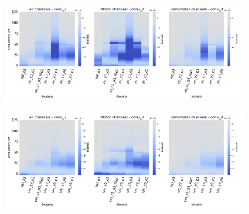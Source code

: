 \begin{figure}[!htpb]
\centering
\RawFloats
\begin{subfigure}[b]{\textwidth}
   \includegraphics[width=1\linewidth]{img/ch4/vel-conv-3-layer-grads}
   \caption{}
\end{subfigure}\label{fig:vel-conv3-layer-grads}

\begin{subfigure}[b]{\textwidth}
   \includegraphics[width=1\linewidth]{img/ch4/vel-conv-3-layer-grads-shifted}
   \caption{}
\end{subfigure}\label{fig:vel-conv3-layer-grads-shifted}
\caption[]{}
\end{figure}

